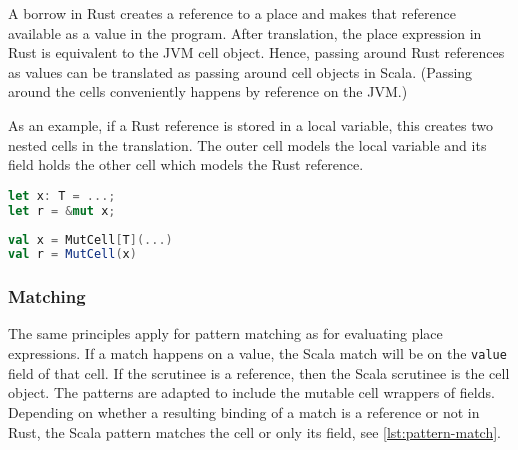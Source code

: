 A borrow in Rust creates a reference to a place and makes that reference
available as a value in the program. After translation, the place expression in
Rust is equivalent to the JVM cell object. Hence, passing around Rust references
as values can be translated as passing around cell objects in Scala. (Passing
around the cells conveniently happens by reference on the JVM.)

As an example, if a Rust reference is stored in a local variable, this creates
two nested cells in the translation. The outer cell models the local variable
and its field holds the other cell which models the Rust reference.

\noindent\begin{minipage}[t]{.48\textwidth}
\begin{lstlisting}[language=Rust, caption={Taking a mutable reference in Rust.}]
let x: T = ...;
let r = &mut x;
\end{lstlisting}
\end{minipage}\hfill
\begin{minipage}[t]{.48\textwidth}
\begin{lstlisting}[language=Scala, caption={Mentioning the cell \lstinline!x! suffices in the translation.}]
val x = MutCell[T](...)
val r = MutCell(x)
\end{lstlisting}
\end{minipage}

\subsubsection{Matching}

The same principles apply for pattern matching as for evaluating place
expressions. If a match happens on a value, the Scala match will be on the
\passthrough{\lstinline!value!} field of that cell. If the scrutinee is a
reference, then the Scala scrutinee is the cell object. The patterns are adapted
to include the mutable cell wrappers of fields. Depending on whether a resulting
binding of a match is a reference or not in Rust, the Scala pattern matches the
cell or only its field, see \autoref{lst:pattern-match}.

